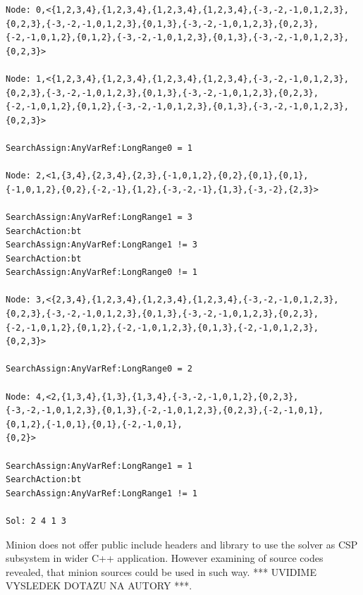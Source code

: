 {\small
\begin{verbatim}
Node: 0,<{1,2,3,4},{1,2,3,4},{1,2,3,4},{1,2,3,4},{-3,-2,-1,0,1,2,3},
{0,2,3},{-3,-2,-1,0,1,2,3},{0,1,3},{-3,-2,-1,0,1,2,3},{0,2,3},
{-2,-1,0,1,2},{0,1,2},{-3,-2,-1,0,1,2,3},{0,1,3},{-3,-2,-1,0,1,2,3},
{0,2,3}>

Node: 1,<{1,2,3,4},{1,2,3,4},{1,2,3,4},{1,2,3,4},{-3,-2,-1,0,1,2,3},
{0,2,3},{-3,-2,-1,0,1,2,3},{0,1,3},{-3,-2,-1,0,1,2,3},{0,2,3},
{-2,-1,0,1,2},{0,1,2},{-3,-2,-1,0,1,2,3},{0,1,3},{-3,-2,-1,0,1,2,3},
{0,2,3}>

SearchAssign:AnyVarRef:LongRange0 = 1

Node: 2,<1,{3,4},{2,3,4},{2,3},{-1,0,1,2},{0,2},{0,1},{0,1},
{-1,0,1,2},{0,2},{-2,-1},{1,2},{-3,-2,-1},{1,3},{-3,-2},{2,3}>

SearchAssign:AnyVarRef:LongRange1 = 3
SearchAction:bt
SearchAssign:AnyVarRef:LongRange1 != 3
SearchAction:bt
SearchAssign:AnyVarRef:LongRange0 != 1

Node: 3,<{2,3,4},{1,2,3,4},{1,2,3,4},{1,2,3,4},{-3,-2,-1,0,1,2,3},
{0,2,3},{-3,-2,-1,0,1,2,3},{0,1,3},{-3,-2,-1,0,1,2,3},{0,2,3},
{-2,-1,0,1,2},{0,1,2},{-2,-1,0,1,2,3},{0,1,3},{-2,-1,0,1,2,3},
{0,2,3}>

SearchAssign:AnyVarRef:LongRange0 = 2

Node: 4,<2,{1,3,4},{1,3},{1,3,4},{-3,-2,-1,0,1,2},{0,2,3},
{-3,-2,-1,0,1,2,3},{0,1,3},{-2,-1,0,1,2,3},{0,2,3},{-2,-1,0,1},
{0,1,2},{-1,0,1},{0,1},{-2,-1,0,1},
{0,2}>

SearchAssign:AnyVarRef:LongRange1 = 1
SearchAction:bt
SearchAssign:AnyVarRef:LongRange1 != 1

Sol: 2 4 1 3
\end{verbatim}
}

Minion does not offer public include headers and library to use the solver
as CSP subsystem in wider C++ application. However examining of source codes
revealed, that minion sources could be used in such way. *** UVIDIME 
VYSLEDEK DOTAZU NA AUTORY ***.
